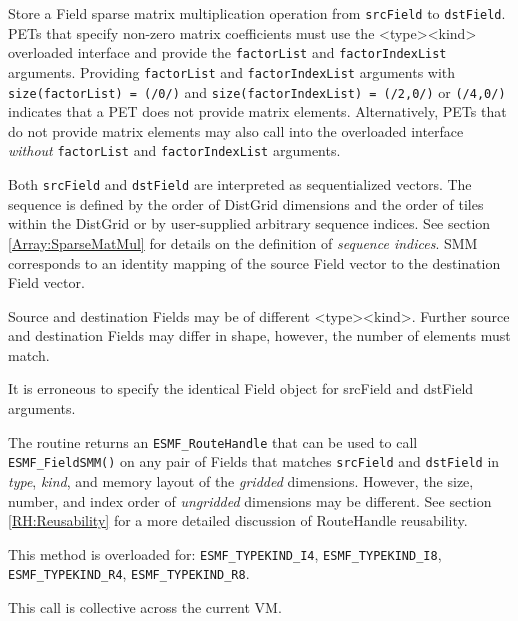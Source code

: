  
  
   \begin{sloppypar}
   Store a Field sparse matrix multiplication operation from {\tt srcField}
   to {\tt dstField}. PETs that specify non-zero matrix coefficients must use
   the <type><kind> overloaded interface and provide the {\tt factorList} and
   {\tt factorIndexList} arguments. Providing {\tt factorList} and
   {\tt factorIndexList} arguments with {\tt size(factorList) = (/0/)} and
   {\tt size(factorIndexList) = (/2,0/)} or {\tt (/4,0/)} indicates that a 
   PET does not provide matrix elements. Alternatively, PETs that do not 
   provide matrix elements may also call into the overloaded interface
   {\em without} {\tt factorList} and {\tt factorIndexList} arguments.
   \end{sloppypar}
   
   Both {\tt srcField} and {\tt dstField} are interpreted as sequentialized 
   vectors. The 
   sequence is defined by the order of DistGrid dimensions and the order of 
   tiles within the DistGrid or by user-supplied arbitrary sequence indices. See 
   section \ref{Array:SparseMatMul} for details on the definition of {\em sequence indices}. 
   SMM corresponds to an identity mapping of the source Field vector to 
   the destination Field vector. 
    
   Source and destination Fields may be of different <type><kind>. Further source 
   and destination Fields may differ in shape, however, the number of elements 
   must match. 
    
   It is erroneous to specify the identical Field object for srcField and dstField 
   arguments. 
    
     The routine returns an {\tt ESMF\_RouteHandle} that can be used to call 
     {\tt ESMF\_FieldSMM()} on any pair of Fields that matches 
     {\tt srcField} and {\tt dstField} in {\em type}, {\em kind}, and 
     memory layout of the {\em gridded} dimensions. However, the size, number, 
     and index order of {\em ungridded} dimensions may be different. See section
     \ref{RH:Reusability} for a more detailed discussion of RouteHandle 
     reusability.
    
   This method is overloaded for:\newline
   {\tt ESMF\_TYPEKIND\_I4}, {\tt ESMF\_TYPEKIND\_I8},\newline 
   {\tt ESMF\_TYPEKIND\_R4}, {\tt ESMF\_TYPEKIND\_R8}.
   \newline
  
   This call is collective across the current VM.  
   
